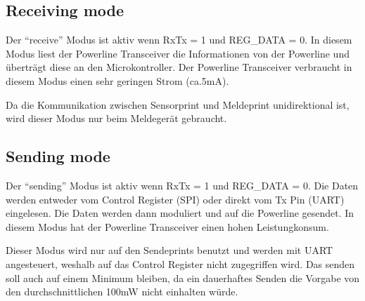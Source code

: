 \subsection{Receiving mode}
Der ``receive'' Modus ist aktiv wenn RxTx = 1 und REG\_DATA = 0. In diesem Modus liest der Powerline Transceiver die Informationen von der Powerline und überträgt diese an den Microkontroller. Der Powerline Transceiver verbraucht in diesem Modus einen sehr geringen Strom (ca.5mA).

Da die Kommunikation zwischen Sensorprint und Meldeprint unidirektional ist, wird dieser Modus nur beim Meldegerät gebraucht.

\subsection{Sending mode}
Der ``sending'' Modus ist aktiv wenn RxTx = 1 und REG\_DATA = 0. Die Daten werden entweder vom Control Register (SPI) oder direkt vom Tx Pin (UART) eingelesen. Die Daten werden dann moduliert und auf die Powerline gesendet. In diesem Modus hat der Powerline Transceiver einen hohen Leistungkonsum.

Dieser Modus wird nur auf den Sendeprints benutzt und werden mit UART angesteuert, weshalb auf das Control Register nicht zugegriffen wird. Das senden soll auch auf einem Minimum bleiben, da ein dauerhaftes Senden die Vorgabe von den durchschnittlichen 100mW nicht einhalten würde.



